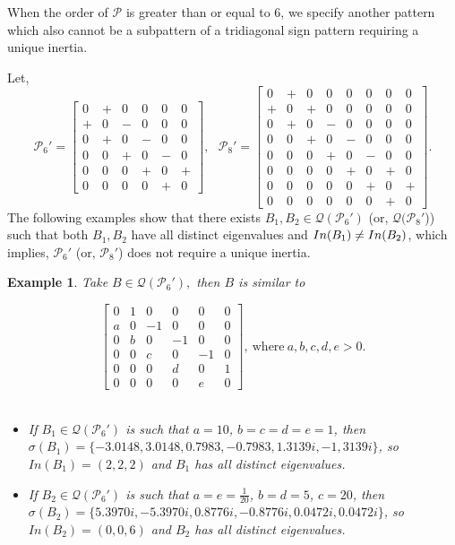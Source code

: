 \documentclass[10pt,a4paper]{amsart}
\newtheorem{eg}{Example}[section]
\numberwithin{equation}{section}
\def\In{{\rm In}}
\begin{document}
When the order of $\mathcal{P}$ is greater than or equal to $6$, we specify another pattern which also cannot be a subpattern of a tridiagonal sign pattern requiring a unique inertia.





Let, $$\mathcal{P}_6'=\begin{bmatrix}
	0&+&0&0&0&0\\+&0&-&0&0&0\\0&+&0&-&0&0\\0&0&+&0&-&0\\0&0&0&+&0&+\\0&0&0&0&+&0
\end{bmatrix}, ~~~
\mathcal{P}_8'=\begin{bmatrix}
	0&+&0&0&0&0&0&0\\+&0&+&0&0&0&0&0\\0&+&0&-&0&0&0&0\\0&0&+&0&-&0&0&0\\0&0&0&+&0&-&0&0\\0&0&0&0&+&0&+&0\\0&0&0&0&0&+&0&+\\0&0&0&0&0&0&+&0
\end{bmatrix}.$$
The following examples show that there exists $B_1, B_2\in \mathcal{Q}(\mathcal{P}_6')$ (or, $\mathcal{Q}(\mathcal{P}_8'$)) such that both $B_1,B_2$ have all distinct eigenvalues and $\In(B_1)\neq \In(B_2)$, which implies, $\mathcal{P}_6'$ (or, $\mathcal{P}_8'$) does not require a unique inertia.

\begin{eg} \label{ega21} 
	Take $B\in \mathcal{Q}(\mathcal{P}_6'),$ then $B$ is similar to
	
	$$\begin{bmatrix}
		0&1&0&0&0&0\\a&0&-1&0&0&0\\0&b&0&-1&0&0\\0&0&c&0&-1&0\\0&0&0&d&0&1\\0&0&0&0&e&0
	\end{bmatrix}, ~\text{where}~ a,b,c,d,e>0.$$ \\
	
	\begin{itemize}
		\item[i.] If $B_1\in \mathcal{Q}(\mathcal{P}_6')$ is such that $a=10$, $b=c=d=e=1$, then $\sigma(B_1)=\{-3.0148,  3.0148, 0.7983, -0.7983, 1.3139i, -1, 3139i\}$, so $In(B_1)=(2,2,2)$ and $B_1$ has all distinct eigenvalues. 
		\item[ii.] If $B_2\in \mathcal{Q}(\mathcal{P}_6')$ is such that $a=e=\frac{1}{20}$, $b=d=5$, $c=20$, then $\sigma(B_2)=\{ 5.3970i,-5.3970i, 0.8776i, -0.8776i, 0.0472i, 0.0472i\}$, so $In(B_2)=(0,0,6)$ and $B_2$ has all distinct eigenvalues.
	\end{itemize}
\end{eg}
\end{document}

